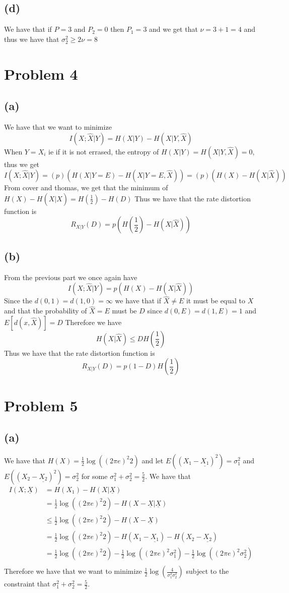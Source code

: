 \subsection*{(d)}
We have that if $P=3$ and $P_2=0$ then $P_1=3$ and we get that $\nu=3+1=4$ and thus we have that 
$\sigma_2^2\geq 2\nu=\boxed{8}$
\section*{Problem 4}
\subsection*{(a)}
We have that we want to minimize
$$I(X;\hat{X}|Y)=H(X|Y)-H(X|Y,\hat{X})$$
When $Y=X_i$ ie if it is not errased, the entropy of $H(X|Y)=H(X|Y,\hat{X})=0$,
thus we get
$$I(X;\hat{X}|Y)=(p)(H(X|Y=E)-H(X|Y=E,\hat{X}))=(p)(H(X)-H(X|\hat{X}))
$$
From cover and thomas, we get that the minimum of $H(X)-H(X|\hat{X})=H(\frac{1}{2})-H(D)$
Thus we have that the rate distortion function is 
$$R_{X|Y}(D)=\boxed{p(H(\frac{1}{2})-H(X|\hat{X}))}$$
\subsection*{(b)}
From the previous part we once again have 
$$I(X;\hat{X}|Y)=p(H(X)-H(X|\hat{X}))$$
Since the $d(0,1)=d(1,0)=\infty$ we have that 
if $\hat{X}\neq E$ it must be equal to $X$ 
and that the probability of $\hat{X}=E$ must be $D$ since
$d(0,E)=d(1,E)=1$ and $E[d(x,\hat{X})]=D$
Therefore we have 
$$H(X|\hat{X})\leq DH(\frac{1}{2})$$
Thus we have that the rate distortion function is 
$$R_{X|Y}(D)=\boxed{p(1-D)H(\frac{1}{2})}$$
\section*{Problem 5}
\subsection*{(a)}
We have that $H(X)=\frac{1}{2}\log((2\pi e)^2 2)$ and let 
$E((X_1-\underline{X_1})^2)=\sigma_1^2$ and $E((X_2-\underline{X_2})^2)=\sigma_2^2$ for 
some $\sigma_1^2+\sigma_2^2=\frac{5}{2}$. We have that
\begin{align*}
    I(X;\underline{X})&=H(X_1)-H(X|\underline{X})\\
    &=\frac{1}{2}\log((2\pi e)^2 2)-H(X-\underline{X}|\underline{X})\\
    &\leq\frac{1}{2}\log((2\pi e)^2 2)-H(X-\underline{X})\\
    &=\frac{1}{2}\log((2\pi e)^2 2)-H(X_1-\underline{X_1})-H(X_2-\underline{X_2})\\
    &=\frac{1}{2}\log((2\pi e)^2 2)-\frac{1}{2}\log((2\pi e)^2 \sigma_1^2)-\frac{1}{2}\log((2\pi e)^2 \sigma_2^2)\\
\end{align*}
Therefore we have that we want to minimize $\frac{1}{2}\log\left(\frac{4}{\sigma_1^2\sigma_2^2}\right)$
subject to the constraint that $\sigma_1^2+\sigma_2^2=\frac{5}{2}$.
